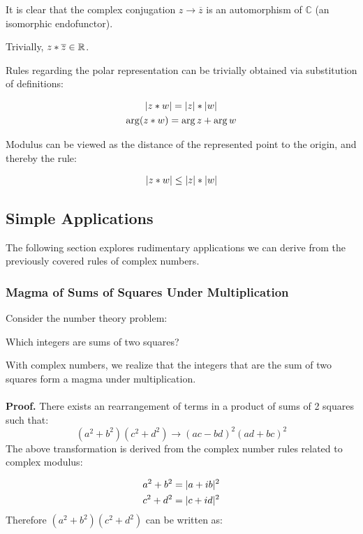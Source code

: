\documentclass[12pt]{article}
\begin{document}
	It is clear that the complex conjugation $z \to \overline z$ is an automorphism of $\mathbb{C}$ (an isomorphic endofunctor).
	
	Trivially, $z * \overline z \in \mathbb{R}$.
	
	Rules regarding the polar representation can be trivially obtained via substitution of definitions:
	
	\begin{gather*}
		\lvert z * w \rvert = \lvert z \rvert * \lvert w \rvert \\
		\arg(z * w) = \arg z + \arg w
	\end{gather*}
	
	Modulus can be viewed as the distance of the represented point to the origin, and thereby the rule:
	
	\begin{gather*}
		\lvert z * w \rvert \leq \lvert z \rvert * \lvert w \rvert
	\end{gather*}
	
	\subsection{Simple Applications}
	
	The following section explores rudimentary applications we can derive from the previously covered rules of complex numbers.
	
	\subsubsection{Magma of Sums of Squares Under Multiplication}
	
	Consider the number theory problem:
	\begin{center}
		Which integers are sums of two squares?
	\end{center}
	
	With complex numbers, we realize that the integers that are the sum of two squares form a magma under multiplication.
	\\\\
	\textbf{Proof.} There exists an rearrangement of terms in a product of sums of 2 squares such that: $$(a^2 + b^2)(c^2 + d^2) \to (ac - bd)^2 (ad + bc)^2$$
	The above transformation is derived from the complex number rules related to complex modulus:
	
	\begin{gather*}
		a^2 + b^2 = \lvert a + ib \rvert^2 \\
		c^2 + d^2 = \lvert c + id \rvert^2
	\end{gather*}
	Therefore $(a^2 + b^2)(c^2 + d^2)$ can be written as:
	
\end{document}
